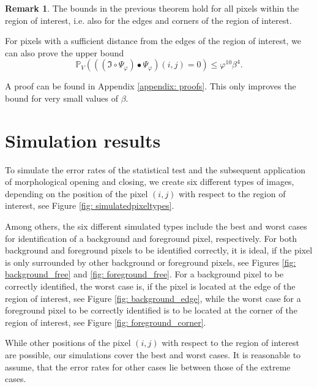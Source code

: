 \documentclass[a4paper,12pt]{article}
\theoremstyle{plain}
\theoremstyle{definition}
\newtheorem{remark}[theorem]{Remark}
\numberwithin{equation}{section}
\begin{document}
\begin{remark}
	The bounds in the previous theorem hold for all pixels within the region of interest, i.e. also for the edges and corners of the region of interest.
	
	For pixels with a sufficient distance from the edges of the region of interest, we can also prove the upper bound
	\begin{equation*}
		\mathbb{P}_V\left( ((\mathfrak{I} \circ \Psi_\varphi) \bullet \Psi_\varphi)(i, j) = 0 \right) \leq \varphi^{10} \beta^4.
	\end{equation*}
	
	A proof can be found in Appendix \ref{appendix: proofs}. This only improves the bound for very small values of $\beta$.
\end{remark}

\newpage



\section{Simulation results}\label{section: simulationresults}

To simulate the error rates of the statistical test and the subsequent application of morphological opening and closing, we create six different types of images, depending on the position of the pixel $(i, j)$ with respect to the region of interest, see Figure \ref{fig: simulatedpixeltypes}.



Among others, the six different simulated types include the best and worst cases for identification of a background and foreground pixel, respectively. For both background and foreground pixels to be identified correctly, it is ideal, if the pixel is only surrounded by other background or foreground pixels, see Figures \ref{fig: background_free} and \ref{fig: foreground_free}.
For a background pixel to be correctly identified, the worst case is, if the pixel is located at the edge of the region of interest, see Figure \ref{fig: background_edge}, while the worst case for a foreground pixel to be correctly identified is to be located at the corner of the region of interest, see Figure \ref{fig: foreground_corner}.

While other positions of the pixel $(i, j)$ with respect to the region of interest are possible, our simulations cover the best and worst cases. It is reasonable to assume, that the error rates for other cases lie between those of the extreme cases.
\end{document}
